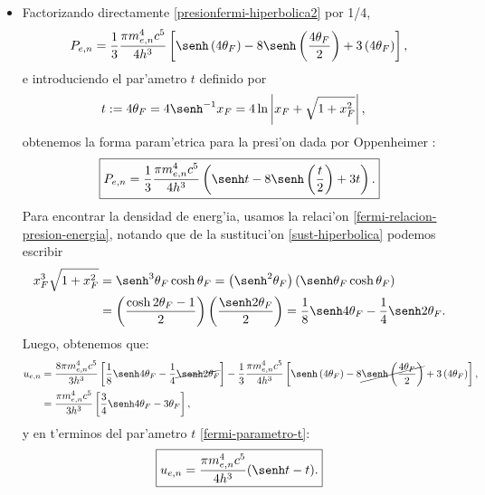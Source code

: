 \begin{itemize}
 \item Factorizando directamente \eqref{presionfermi-hiperbolica2} por 1/4,
\begin{align}
 P_{e,n}=\frac{1}{3}\frac{\pi m_{e,n}^4c^5}{4h^3}\left[\senh\left(4\theta_F\right)-8\senh\left(\frac{4\theta_F}{2}\right)+3\left(4\theta_F\right)\right],
\end{align}
e introduciendo el par'ametro $t$ definido por
\begin{align}\label{fermi-parametro-t}
 t:=4\theta_F&=4\senh^{-1}x_F=4\ln\left|x_F+\sqrt{1+x_F^2}\right|,
\end{align}
obtenemos la forma param'etrica para la presi'on dada por Oppenheimer \cite{Oppenheimer39enero}:
\begin{align}\label{fermi-presion-OV}
 \boxed{P_{e,n}=\frac{1}{3}\frac{\pi m_{e,n}^4c^5}{4h^3}\left(\senh t-8\senh\left(\frac{t}{2}\right)+3t\right).}
\end{align}
Para encontrar la densidad de energ'ia, usamos la relaci'on \eqref{fermi-relacion-presion-energia}, notando que de la sustituci'on \eqref{sust-hiperbolica} podemos escribir
\begin{align}
 x_F^3\sqrt{1+x_F^2}&=\senh^3\theta_F\cosh\theta_F=\left(\senh^2\theta_F\right)\left(\senh\theta_F \cosh\theta_F\right)\\
&=\left(\frac{\cosh 2\theta_F-1}{2}\right)\left(\frac{\senh 2\theta_F}{2}\right)
=\frac{1}{8}\senh4\theta_F-\frac{1}{4}\senh2\theta_F.
\end{align}
Luego, obtenemos que:
\begin{align}
u_{e,n}&=\frac{8\pi m_{e,n}^4c^5}{3h^3}\left[\frac{1}{8}\senh4\theta_F-\frac{1}{4}\cancel{\senh2\theta_F}\right]-\frac{1}{3}\frac{\pi m_{e,n}^4c^5}{4h^3}\left[\senh\left(4\theta_F\right)-8\cancel{\senh\left(\frac{4\theta_F}{2}\right)}+3\left(4\theta_F\right)\right],\\
&=\frac{\pi m_{e,n}^4c^5}{3h^3}\left[\frac{3}{4}\senh 4\theta_F-3\theta_F\right],
\end{align}
y en t'erminos del par'ametro $t$ \eqref{fermi-parametro-t}:
\begin{align}\label{fermi-energia-OV}
 \boxed{u_{e,n}=\frac{\pi m_{e,n}^4c^5}{4h^3}(\senh t-t).}
\end{align}


\end{itemize}
